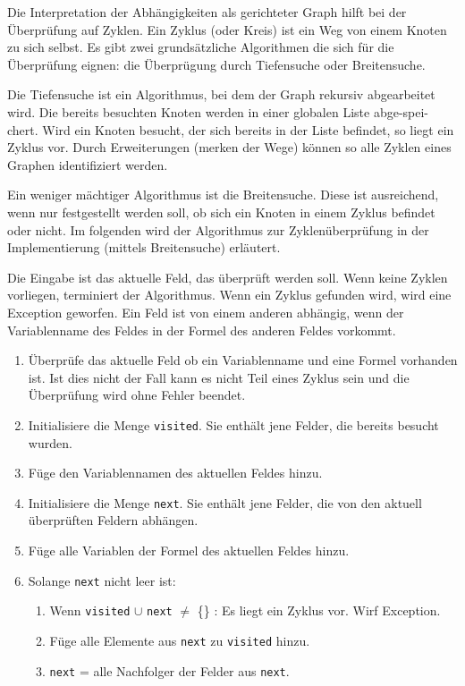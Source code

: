 Die Interpretation der Abhängigkeiten als gerichteter Graph hilft bei der Überprüfung auf Zyklen. Ein Zyklus (oder Kreis) ist ein Weg von einem Knoten zu sich selbst\cite{Schl08}. Es gibt zwei grund\-sätz\-liche Algorithmen die sich für die Überprüfung eignen: die Überprügung durch Tiefensuche oder Breitensuche.

Die Tiefensuche ist ein Algorithmus, bei dem der Graph rekursiv abgearbeitet wird. Die bereits besuchten Knoten werden in einer globalen Liste abge-spei-chert. Wird ein Knoten besucht, der sich bereits in der Liste befindet, so liegt ein Zyklus vor. Durch Erweiterungen (merken der Wege) können so alle Zyklen eines Graphen identifiziert werden.

Ein weniger mächtiger Algorithmus ist die Breitensuche. Diese ist ausreichend, wenn nur festgestellt werden soll, ob sich ein Knoten in einem Zyklus befindet oder nicht. Im folgenden wird der Algorithmus zur Zyklenüberprüfung in der Implementierung (mittels Breitensuche) erläutert.

Die Eingabe ist das aktuelle Feld, das überprüft werden soll. Wenn keine Zyklen vorliegen, terminiert der Algorithmus. Wenn ein Zyklus gefunden wird, wird eine Exception geworfen. Ein Feld ist von einem anderen abhängig, wenn der Variablenname des Feldes in der Formel des anderen Feldes vorkommt.

\begin{enumerate}
  \item Überprüfe das aktuelle Feld ob ein Variablenname und eine Formel vorhanden ist. Ist dies nicht der Fall kann es nicht Teil eines Zyklus sein und die Überprüfung wird ohne Fehler beendet.
  
  \item Initialisiere die Menge \texttt{visited}. Sie enthält jene Felder, die bereits besucht wurden. 

  \item Füge den Variablennamen des aktuellen Feldes hinzu.

  \item Initialisiere die Menge \texttt{next}. Sie enthält jene Felder, die von den aktuell überprüften Feldern abhängen.

  \item Füge alle Variablen der Formel des aktuellen Feldes hinzu.

  \item Solange \texttt{next} nicht leer ist:

    \begin{enumerate}
      \item Wenn \texttt{visited} $\cup$ \texttt{next} $\neq$ \{\} : Es liegt ein Zyklus vor. Wirf Exception.
      \item Füge alle Elemente aus \texttt{next} zu \texttt{visited} hinzu.
      \item \texttt{next} = alle Nachfolger der Felder aus \texttt{next}.
    \end{enumerate}
\end{enumerate}


